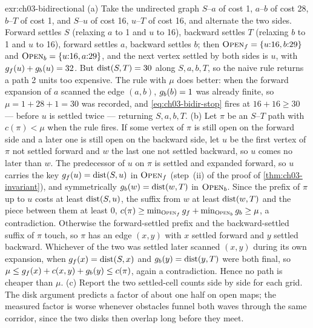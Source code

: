 \begin{solution}{exr:ch03-bidirectional}
(a) Take the undirected graph $S$--$a$ of cost 1, $a$--$b$ of cost 28, $b$--$T$ of cost 1, and $S$--$u$ of cost 16, $u$--$T$ of cost 16, and alternate the two sides. Forward settles $S$ (relaxing $a$ to 1 and $u$ to 16), backward settles $T$ (relaxing $b$ to 1 and $u$ to 16), forward settles $a$, backward settles $b$; then $\text{\textsc{Open}}_f=\{u{:}16,b{:}29\}$ and $\text{\textsc{Open}}_b=\{u{:}16,a{:}29\}$, and the next vertex settled by both sides is $u$, with $g_f(u)+g_b(u)=32$. But $\operatorname{dist}(S,T)=30$ along $S,a,b,T$, so the naive rule returns a path 2 units too expensive. The rule with $\mu$ does better: when the forward expansion of $a$ scanned the edge $(a,b)$, $g_b(b)=1$ was already finite, so $\mu=1+28+1=30$ was recorded, and \cref{eq:ch03-bidir-stop} fires at $16+16\ge30$ --- before $u$ is settled twice --- returning $S,a,b,T$.
(b) Let $\pi$ be an $S$--$T$ path with $c(\pi)<\mu$ when the rule fires. If some vertex of $\pi$ is still open on the forward side and a later one is still open on the backward side, let $u$ be the first vertex of $\pi$ not settled forward and $w$ the last one not settled backward, so $u$ comes no later than $w$. The predecessor of $u$ on $\pi$ is settled and expanded forward, so $u$ carries the key $g_f(u)=\operatorname{dist}(S,u)$ in $\text{\textsc{Open}}_f$ (step~(ii) of the proof of \cref{thm:ch03-invariant}), and symmetrically $g_b(w)=\operatorname{dist}(w,T)$ in $\text{\textsc{Open}}_b$. Since the prefix of $\pi$ up to $u$ costs at least $\operatorname{dist}(S,u)$, the suffix from $w$ at least $\operatorname{dist}(w,T)$ and the piece between them at least 0, $c(\pi)\ge\min_{\text{\textsc{Open}}_f}g_f+\min_{\text{\textsc{Open}}_b}g_b\ge\mu$, a contradiction. Otherwise the forward-settled prefix and the backward-settled suffix of $\pi$ touch, so $\pi$ has an edge $(x,y)$ with $x$ settled forward and $y$ settled backward. Whichever of the two was settled later scanned $(x,y)$ during its own expansion, when $g_f(x)=\operatorname{dist}(S,x)$ and $g_b(y)=\operatorname{dist}(y,T)$ were both final, so $\mu\le g_f(x)+c(x,y)+g_b(y)\le c(\pi)$, again a contradiction. Hence no path is cheaper than $\mu$.
(c) Report the two settled-cell counts side by side for each grid. The disk argument predicts a factor of about one half on open maps; the measured factor is worse whenever obstacles funnel both waves through the same corridor, since the two disks then overlap long before they meet.
\end{solution}
